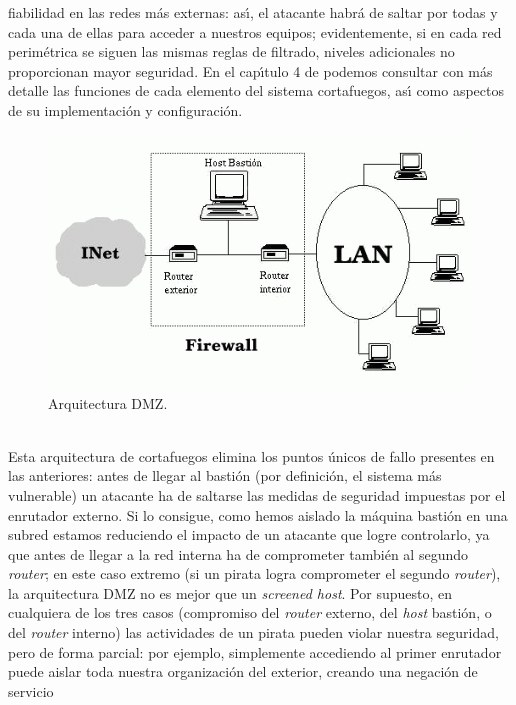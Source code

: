 fiabilidad en las redes m\'as externas: as\'{\i}, el atacante habr\'a de saltar 
por todas y cada una de ellas para acceder a nuestros equipos; evidentemente,
si en cada red perim\'etrica se siguen las mismas reglas de filtrado, niveles
adicionales no proporcionan mayor seguridad. En el cap\'{\i}tulo 4 de 
\cite{kn:bre95} podemos consultar con m\'as detalle las funciones de cada
elemento del sistema cortafuegos, as\'{\i} como aspectos de su 
implementaci\'on y configuraci\'on.\\
\begin{figure}
\begin{center}
\includegraphics[width=\textwidth]{dmz.png}
\caption{Arquitectura DMZ.}
\label{dmz}
\end{center}
\end{figure}
\\Esta arquitectura de cortafuegos elimina los puntos \'unicos de fallo 
presentes en las anteriores: antes de llegar al basti\'on (por definici\'on, el
sistema m\'as vulnerable) un atacante ha de saltarse las medidas de seguridad 
impuestas por
el enrutador externo. Si lo consigue, como hemos aislado la m\'aquina basti\'on 
en una subred estamos reduciendo el impacto de un atacante que logre 
controlarlo, ya que antes de llegar a la red interna ha de comprometer 
tambi\'en al segundo {\it router}; en este caso extremo (si un pirata logra 
comprometer el segundo {\it router}), la arquitectura DMZ no es mejor que un 
{\it screened host}. Por supuesto, en cualquiera de los tres casos (compromiso
del {\it router} externo, del {\it host} basti\'on, o del {\it router} interno)
las actividades de un pirata pueden violar nuestra seguridad, pero de forma
parcial: por ejemplo, simplemente accediendo al primer enrutador puede aislar 
toda nuestra organizaci\'on del exterior, creando una negaci\'on de servicio 
